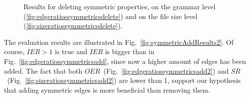 \begin{figure}[h]
	\centering
	\hfill 
	\caption{Results for deleting symmetric properties, on the grammar level (\ref{fig:edgeratiossymmetricsdelete}) and on the file size level (\ref{fig:sizeratiossymmetricsdelete}).}
	\label{fig:symmetricDeleteResults}
\end{figure}

The evaluation results are illustrated in Fig.~\ref{fig:symmetricAddResults2}. Of course, $IER>1$ is true and $IER$ is bigger than in Fig.~\ref{fig:edgeratiossymmetricsadd}, since now a higher amount of edges has been added. The fact that both $OER$~(Fig.~\ref{fig:edgeratiossymmetricsadd2}) and $SR$~(Fig.~\ref{fig:sizeratiossymmetricsadd2}) are lower than 1, support our hypothesis that adding symmetric edges is more beneficial than removing them.

